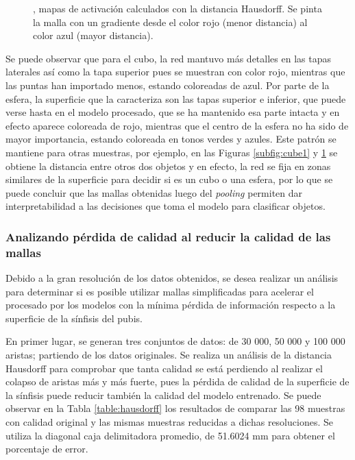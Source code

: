 \begin{figure}[p]
\begin{subfigure}{\linewidth}
        \caption{}
        \label{subfig:sphere1}
    \end{subfigure}
    \caption[SphereCubes: Mapas de activación]{, mapas de activación calculados con la distancia Hausdorff. Se pinta la malla con un gradiente desde el color rojo (menor distancia) al color azul (mayor distancia).}
    \label{fig:sphereCubes_heatmap}
\end{figure}

Se puede observar que para el cubo, la red mantuvo más detalles en las tapas laterales así como la tapa superior pues se muestran con color rojo, mientras que las puntas han importado menos, estando coloreadas de azul. Por parte de la esfera, la superficie que la caracteriza son las tapas superior e inferior, que puede verse hasta en el modelo procesado, que se ha mantenido esa parte intacta y en efecto aparece coloreada de rojo, mientras que el centro de la esfera no ha sido de mayor importancia, estando coloreada en tonos verdes y azules. Este patrón se mantiene para otras muestras, por ejemplo, en las Figuras \ref{subfig:cube1} y \ref{subfig:sphere1} se obtiene la distancia entre otros dos objetos y en efecto, la red se fija en zonas similares de la superficie para decidir si es un cubo o una esfera, por lo que se puede concluir que las mallas obtenidas luego del \textit{pooling} permiten dar interpretabilidad a las decisiones que toma el modelo para clasificar objetos.

\subsubsection{Analizando pérdida de calidad al reducir la calidad de las mallas}
\label{section:hausdorff}
Debido a la gran resolución de los datos obtenidos, se desea realizar un análisis para determinar si es posible utilizar mallas simplificadas para acelerar el procesado por los modelos con la mínima pérdida de información respecto a la superficie de la sínfisis del pubis.

En primer lugar, se generan tres conjuntos de datos: de 30 000, 50 000 y 100 000 aristas; partiendo de los datos originales. Se realiza un análisis de la distancia Hausdorff para comprobar que tanta calidad se está perdiendo al realizar el colapso de aristas más y más fuerte, pues la pérdida de calidad de la superficie de la sínfisis puede reducir también la calidad del modelo entrenado. Se puede observar en la Tabla \ref{table:hausdorff} los resultados de comparar las 98 muestras con calidad original y las mismas muestras reducidas a dichas resoluciones. Se utiliza la diagonal caja delimitadora promedio, de 51.6024 mm para obtener el porcentaje de error.

